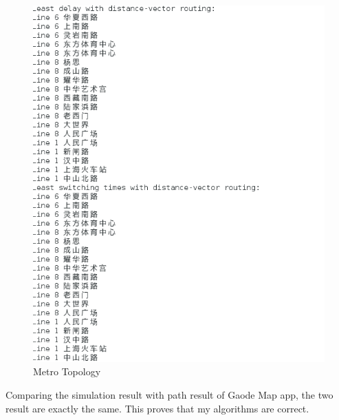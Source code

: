 \documentclass[12pt]{article}
\begin{document}
\begin{figure}[H]
	\begin{center}
		\includegraphics[width=1\textwidth]{figures/6}
	\end{center}
	\caption{Metro Topology}
	\label{1}
\end{figure}

Comparing the simulation result with path result of Gaode Map app, the two result are exactly the same. This proves that my algorithms are correct.



\end{document}
